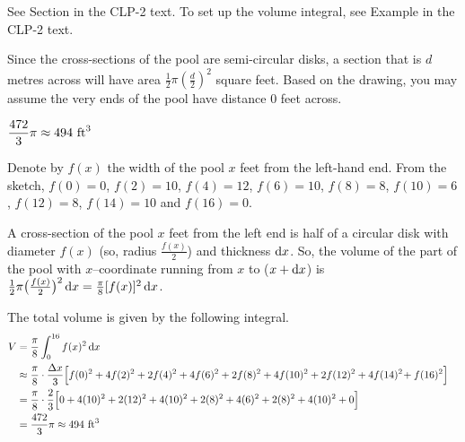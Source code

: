 \begin{hint}
See Section  in the
CLP-2 text.
To set up the volume integral, see Example  in the
CLP-2 text.

Since the cross-sections of the pool are semi-circular disks, a section that is $d$ metres across will have area $\frac{1}{2}\pi\left(\frac{d}{2}\right)^2$ square feet.  Based on the drawing, you may assume the very ends of the pool have distance 0 feet across.
\end{hint}

\begin{answer}
$\dfrac{472}{3}\pi\approx 494 \ {\rm ft}^3$
\end{answer}

\begin{solution}
 Denote by $f(x)$ the width of the pool  $x$ feet
from the left-hand end. From the sketch, $f(0)=0$, $f(2)=10$, $f(4)=12$, $f(6)=10$,
$f(8)=8$, $f(10)=6$, $f(12)=8$, $f(14)=10$ and $f(16)=0$.

A cross-section of the pool $x$ feet from the left end is half of a circular disk with diameter $f(x)$ (so, radius $\frac{f(x)}{2}$) and thickness $\mathrm{d}x$. So, the volume of
the part of the pool with $x$--coordinate running from $x$ to ($x+\mathrm{d}x$) is
$\tfrac{1}{2}\pi\big(\frac{f(x)}{2}\big)^2\,\mathrm{d}x = \frac{\pi}{8}[f(x)]^2\,\mathrm{d}x$.


The total volume is given by the following integral.
\begin{align*}
V&=\frac{\pi}{8}\int_0^{16}f(x)^2\,\mathrm{d}x\cr
&\approx\frac{\pi}{8}\cdot\frac{\Delta x}{3}
\Big[f(0)^2+4f(2)^2+2f(4)^2+4f(6)^2+2f(8)^2
+4f(10)^2+2f(12)^2+4f(14)^2\!+f(16)^2\Big]\cr
&=\frac{\pi}{8}\cdot\frac{2}{3}
\Big[0+4(10)^2+2(12)^2+4(10)^2+2(8)^2
+4(6)^2+2(8)^2+4(10)^2+0\Big]\cr
&=\frac{472}{3}\pi\approx 494 \ {\rm ft}^3
\end{align*}

\end{solution}

